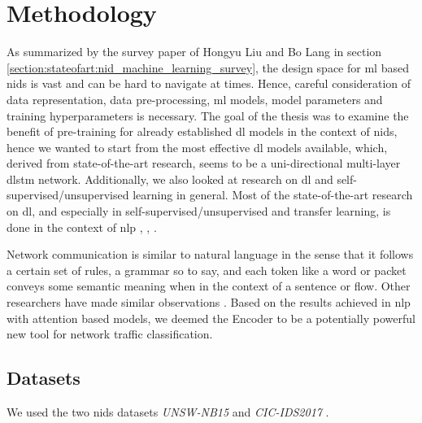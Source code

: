 \chapter{Methodology} \label{sec:methodology}

As summarized by the survey paper \cite{nid_ml_survey_2019} of Hongyu Liu and Bo Lang in section \ref{section:stateofart:nid_machine_learning_survey}, the design space for \gls{ml} based \gls{nids} is vast and can be hard to navigate at times. Hence, careful consideration of data representation, data pre-processing, \gls{ml} models, model parameters and training hyperparameters is necessary. The goal of the thesis was to examine the benefit of pre-training for already established \gls{dl} models in the context of \gls{nids}, hence we wanted to start from the most effective \gls{dl} models available, which, derived from state-of-the-art research, seems to be a uni-directional multi-layer \gls{dlstm} network. Additionally, we also looked at research on \gls{dl} and self-supervised/unsupervised learning in general. Most of the state-of-the-art research on \gls{dl}, and especially in self-supervised/unsupervised and transfer learning, is done in the context of \gls{nlp} \cite{bert}, \cite{elmo}, \cite{attention}.

Network communication is similar to natural language in the sense that it follows a certain set of rules, a grammar so to say, and each token like a word or packet conveys some semantic meaning when in the context of a sentence or flow. Other researchers have made similar observations \cite{anomaly_detection_recurrent_neural_networks}. Based on the results achieved in \gls{nlp} with attention based models, we deemed the Encoder to be a potentially powerful new tool for network traffic classification. 

\section{Datasets} \label{sec:methodology:datasets}

We used the two \gls{nids} datasets \textit{UNSW-NB15} \cite{unsw_nb15} and \textit{CIC-IDS2017} \cite{cic_ids_2017}. \par

